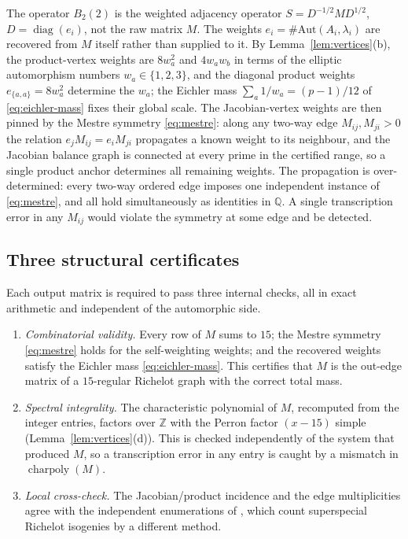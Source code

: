\documentclass[11pt]{amsart}
\theoremstyle{plain}
\theoremstyle{definition}
\newcommand{\Q}{\mathbb{Q}}
\newcommand{\Z}{\mathbb{Z}}
\newcommand{\Aut}{\mathrm{Aut}}
\DeclareMathOperator{\charp}{charpoly}
\DeclareMathOperator{\diag}{diag}
\providecommand{\charp}{\operatorname{charpoly}}
\begin{document}
	The operator $B_2(2)$ is the weighted adjacency operator
	$S=D^{-1/2}MD^{1/2}$, $D=\diag(e_i)$, not the raw matrix $M$. The weights
	$e_i=\#\Aut(A_i,\lambda_i)$ are recovered from $M$ itself rather than
	supplied to it. By Lemma~\ref{lem:vertices}(b), the product-vertex weights
	are $8w_a^2$ and $4w_aw_b$ in terms of the elliptic automorphism numbers
	$w_a\in\{1,2,3\}$, and the diagonal product weights $e_{\{a,a\}}=8w_a^2$
	determine the $w_a$; the Eichler mass $\sum_a1/w_a=(p-1)/12$ of
	\eqref{eq:eichler-mass} fixes their global scale. The Jacobian-vertex
	weights are then pinned by the Mestre symmetry \eqref{eq:mestre}: along
	any two-way edge $M_{ij},M_{ji}>0$ the relation $e_jM_{ij}=e_iM_{ji}$
	propagates a known weight to its neighbour, and the Jacobian balance graph
	is connected at every prime in the certified range, so a single product
	anchor determines all remaining weights. The propagation is
	over-determined: every two-way ordered edge imposes one independent
	instance of \eqref{eq:mestre}, and all hold simultaneously as identities
	in $\Q$. A single transcription error in any $M_{ij}$ would violate the
	symmetry at some edge and be detected.
	
	\subsection{Three structural certificates}
	\label{ss:pillars}
	
	Each output matrix is required to pass three internal checks, all in exact
	arithmetic and independent of the automorphic side.
	
	\begin{enumerate}[label=\textup{(P\arabic*)},leftmargin=2.6em]
		\item \emph{Combinatorial validity.} Every row of $M$ sums to $15$; the
		Mestre symmetry \eqref{eq:mestre} holds for the self-weighting weights;
		and the recovered weights satisfy the Eichler mass \eqref{eq:eichler-mass}.
		This certifies that $M$ is the out-edge matrix of a $15$-regular Richelot
		graph with the correct total mass.
		\item \emph{Spectral integrality.} The characteristic polynomial of $M$,
		recomputed from the integer entries, factors over $\Z$ with the Perron
		factor $(x-15)$ simple (Lemma~\ref{lem:vertices}(d)). This is checked
		independently of the system that produced $M$, so a transcription error in
		any entry is caught by a mismatch in $\charp(M)$.
		\item \emph{Local cross-check.} The Jacobian/product incidence and the
		edge multiplicities agree with the independent enumerations of
		\cite{KatsuraTakashima,FloritSmith}, which count superspecial Richelot
		isogenies by a different method.
	\end{enumerate}
	
\end{document}
